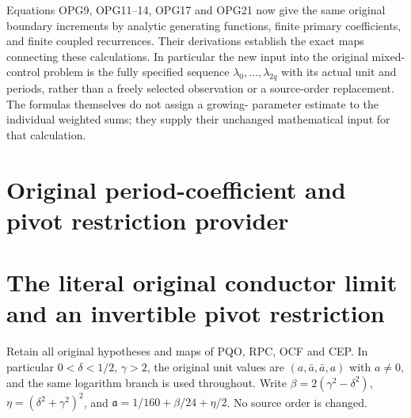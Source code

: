 \documentclass[11pt,a4paper]{article}
\begin{document}
Equations OPG9, OPG11--14, OPG17 and OPG21 now give the same
original boundary increments by analytic generating functions,
finite primary coefficients, and finite coupled recurrences.
Their derivations establish the exact maps connecting these
calculations. In particular the new input into the original
mixed-control problem is the fully specified sequence
$\lambda_0,\ldots,\lambda_{2q}$ with its actual unit and periods,
rather than a freely selected observation or a source-order
replacement. The formulas themselves do not assign a growing-
parameter estimate to the individual weighted sums; they supply
their unchanged mathematical input for that calculation.


\endgroup

\clearpage
\begingroup


\setcounter{equation}{0}
\renewcommand{\theequation}{PCL.\arabic{equation}}
\section*{Original period-coefficient and pivot restriction provider}
\section{The literal original conductor limit and an invertible pivot restriction}
\label{pcl:sec:PCL}
Retain all original hypotheses and maps of PQO, RPC, OCF and CEP.
In particular $0<\delta<1/2$, $\gamma>2$, the original unit values
are $(a,\bar a,\bar a,a)$ with $a\ne0$, and the same logarithm
branch is used throughout. Write $\beta=2(\gamma^2-\delta^2)$,
$\eta=(\delta^2+\gamma^2)^2$, and
$\mathfrak a=1/160+\beta/24+\eta/2$. No source order is changed.
\end{document}
